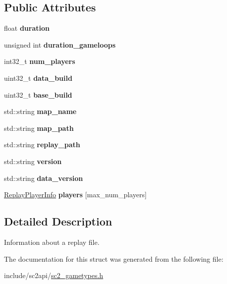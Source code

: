\subsection*{Public Attributes}
\begin{DoxyCompactItemize}
\item 
\mbox{\label{structsc2_1_1_replay_info_a8158d35ccbf3d64d2efcc2c219e85eaf}} 
float {\bfseries duration}
\item 
\mbox{\label{structsc2_1_1_replay_info_a932258b409210d899c9c4f190f31ee3c}} 
unsigned int {\bfseries duration\+\_\+gameloops}
\item 
\mbox{\label{structsc2_1_1_replay_info_ad5849aad19d5b0077c250be958bdf48a}} 
int32\+\_\+t {\bfseries num\+\_\+players}
\item 
\mbox{\label{structsc2_1_1_replay_info_abc6b972e05dc1551f486cb4d67681724}} 
uint32\+\_\+t {\bfseries data\+\_\+build}
\item 
\mbox{\label{structsc2_1_1_replay_info_a7509c6f50212f8b569ded8a1bb21f264}} 
uint32\+\_\+t {\bfseries base\+\_\+build}
\item 
\mbox{\label{structsc2_1_1_replay_info_a89576422f440d605928047a3af0e90e1}} 
std\+::string {\bfseries map\+\_\+name}
\item 
\mbox{\label{structsc2_1_1_replay_info_a8d8231a57b55a71d2939023bedccafc1}} 
std\+::string {\bfseries map\+\_\+path}
\item 
\mbox{\label{structsc2_1_1_replay_info_a8ffd466b2abbd67a4ceadefd0bf697ed}} 
std\+::string {\bfseries replay\+\_\+path}
\item 
\mbox{\label{structsc2_1_1_replay_info_aacb2d2899b658ece79b143fa5b9376c2}} 
std\+::string {\bfseries version}
\item 
\mbox{\label{structsc2_1_1_replay_info_aeb1df27b2c2b5f5d4f82208226276a36}} 
std\+::string {\bfseries data\+\_\+version}
\item 
\mbox{\label{structsc2_1_1_replay_info_acbf40a354f66ab304654086c1ded5c85}} 
\hyperlink{structsc2_1_1_replay_player_info}{Replay\+Player\+Info} {\bfseries players} \mbox{[}max\+\_\+num\+\_\+players\mbox{]}
\end{DoxyCompactItemize}


\subsection{Detailed Description}
Information about a replay file. 

The documentation for this struct was generated from the following file\+:\begin{DoxyCompactItemize}
\item 
include/sc2api/\hyperlink{sc2__gametypes_8h}{sc2\+\_\+gametypes.\+h}\end{DoxyCompactItemize}
